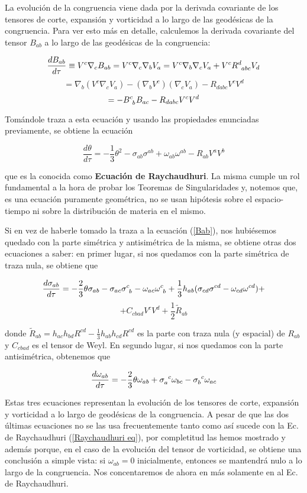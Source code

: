La evolución de la congruencia viene dada por la derivada covariante de los tensores de corte, expansión y vorticidad a lo largo de las geodésicas de la congruencia. Para ver esto más en detalle, calculemos la derivada covariante del tensor $B_{ab}$ a lo largo de las geodésicas de la congruencia:

$$
\frac{dB_{ab}}{d\tau}\equiv V^c\nabla_cB_{ab}=V^c\nabla_c\nabla_bV_a=V^c\nabla_b\nabla_cV_a+V^c\tensor{R}{^d_{abc}}V_d
$$
$$
=\nabla_b(V^c\nabla_cV_a)-(\nabla_bV^c)(\nabla_cV_a)-R_{dabc}V^cV^d
$$
\begin{equation}\label{Bab}
    =-\tensor{B}{^c_b}B_{ac}-R_{dabc}V^cV^d
\end{equation}



Tomándole traza a esta ecuación y usando las propiedades enunciadas previamente, se obtiene la ecuación

\begin{equation}\label{Raychaudhuri eq}
     \frac{d\theta}{d\tau}=-\frac{1}{3}\theta^2-\sigma_{ab}\sigma^{ab}+\omega_{ab}\omega^{ab}-R_{ab}V^aV^b
\end{equation}

que es la conocida como \textbf{Ecuación de Raychaudhuri}. La misma cumple un rol fundamental a la hora de probar los Teoremas de Singularidades y, notemos que, es una ecuación puramente geométrica, no se usan hipótesis sobre el espacio-tiempo ni sobre la distribución de materia en el mismo.


Si en vez de haberle tomado la traza a la ecuación (\ref{Bab}), nos hubiésemos quedado con la parte simétrica y antisimétrica de la misma, se obtiene otras dos ecuaciones a saber: en primer lugar, si nos quedamos con la parte simétrica de traza nula, se obtiene que

$$
\frac{d\sigma_{ab}}{d\tau}=-\frac{2}{3}\theta\sigma_{ab}-\sigma_{ac}\tensor{\sigma}{^c_b}-\omega_{ac}\tensor{\omega}{^c_b}+\frac{1}{3}h_{ab}(\sigma_{cd}\sigma^{cd}-\omega_{cd}\omega^{cd})+
$$
$$
+C_{cbad}V^cV^d+\frac{1}{2}\tilde{R}_{ab}
$$

donde $\tilde{R}_{ab}=h_{ac}h_{bd}R^{cd}-\frac{1}{3}h_{ab}h_{cd}R^{cd}$  es la parte con traza nula (y espacial) de $R_{ab}$ y $C_{cbad}$ es el tensor de Weyl. En segundo lugar, si nos quedamos con la parte antisimétrica, obtenemos que

$$
\frac{d\omega_{ab}}{d\tau}=-\frac{2}{3}\theta\omega_{ab}+\tensor{\sigma}{_a^c}\omega_{bc}-\tensor{\sigma}{_b^c}\omega_{ac}
$$


Estas tres ecuaciones representan la evolución de los tensores de corte, expansión y vorticidad a lo largo de geodésicas de la congruencia. A pesar de que las dos últimas ecuaciones no se las usa frecuentemente tanto como así sucede con la Ec. de Raychaudhuri (\ref{Raychaudhuri eq}), por completitud las hemos mostrado y además porque, en el caso de la evolución del tensor de vorticidad, se obtiene una conclusión a simple vista: si $\omega_{ab}=0$ inicialmente, entonces se mantendrá nulo a lo largo de la congruencia. Nos concentaremos de ahora en más solamente en al Ec. de Raychaudhuri. 

